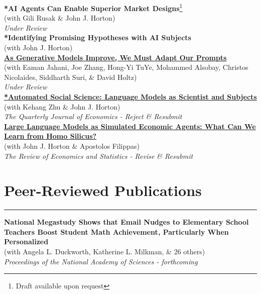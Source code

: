 \documentclass[11.25pt]{article}
\begin{document}
\noindent\textbf{*AI Agents Can Enable Superior Market Designs}\footnote{Draft available upon request}\\ 
(with Gili Rusak \& John J. Horton)\\
\textit{Under Review}\\

\noindent\textbf{*Identifying Promising Hypotheses with AI Subjects}\footnotemark[\value{footnote}]\\ 
(with John J. Horton)\\

\noindent\textbf{\href{https://arxiv.org/abs/2407.14333}{As Generative Models Improve, We Must Adapt Our Prompts}} \\ (with Eaman Jahani, Joe Zhang, Hong-Yi TuYe, Mohammed Alsobay, Christos Nicolaides, Siddharth
Suri, \& David Holtz)\\
\textit{Under Review}\\

\noindent\textbf{\href{https://www.nber.org/papers/w32381}{*Automated Social Science: Language Models as Scientist and Subjects}}\\ 
(with Kehang Zhu \& John J. Horton)\\
\textit{The Quarterly Journal of Economics - Reject \& Resubmit}\\

\noindent\href{https://www.nber.org/papers/w31122}{\textbf{Large Language Models as Simulated Economic Agents: What Can We Learn from Homo Silicus?}} \\ (with John J. Horton \& Apostolos Filippas) \\
\textit{The Review of Economics and Statistics - Revise \& Resubmit}\\

\section*{Peer-Reviewed Publications} \vspace{-1mm} \hrule
\vspace{3mm}

\noindent \textbf{National Megastudy Shows that Email Nudges to Elementary School Teachers Boost Student Math Achievement, Particularly When Personalized} \\
(with Angela L. Duckworth, Katherine L. Milkman, \& 26 others) \\
\textit{Proceedings of the National Academy of Sciences - forthcoming}\\
\end{document}
